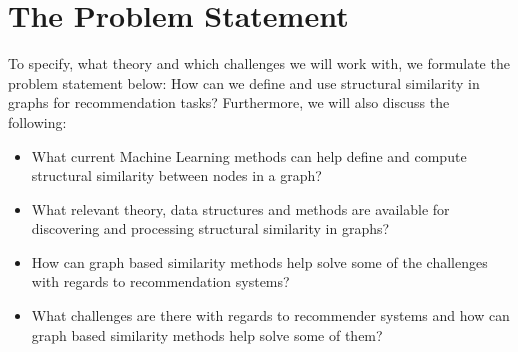 \section{The Problem Statement}
  To specify, what theory and which challenges we will work with, we formulate the problem statement below:
  How can we define and use structural similarity in graphs for recommendation tasks?
  Furthermore, we will also discuss the following:
  \begin{itemize}
    \item What current Machine Learning methods can help define and compute structural similarity between nodes in a graph?
    \item What relevant theory, data structures and methods are available for discovering and processing structural similarity in graphs?
    \item How can graph based similarity methods help solve some of the challenges with regards to recommendation systems?
    \item What challenges are there with regards to recommender systems and how can graph based similarity methods help solve some of them?
    
  \end{itemize}
